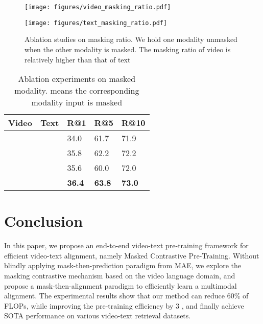 \documentclass[10pt,twocolumn,letterpaper]{article}
\begin{document}
\begin{figure}[htbp]
\centering
\setlength{\abovecaptionskip}{0.cm}
\begin{minipage}[t]{0.48\textwidth}
\centering
\texttt{[image: figures/video\_masking\_ratio.pdf]}
\end{minipage}
\begin{minipage}[t]{0.48\textwidth}
\centering
\texttt{[image: figures/text\_masking\_ratio.pdf]}
 \caption{Ablation studies on masking ratio. We hold one modality unmasked when the other modality is masked. The masking ratio of video is relatively higher than that of text} 
\label{fig:masking ratio}\vspace{-1mm}

\end{minipage}
\end{figure}





\begin{table}[h]
    \centering
    \small
    \begin{tabular}{@{}ll|lll@{}}
    \toprule
    \textbf{Video}  &  \textbf{Text}   &  \textbf{R@1}   & \textbf{R@5}    & \textbf{R@10}     \\ \midrule
                  &                  &  34.0      & 61.7      & 71.9    \\
      &                  & 35.8       & 62.2      & 72.2    \\ 
                  &      & 35.6       & 60.0      & 72.0         \\  
      &      & \textbf{36.4}       &  \textbf{63.8}     & \textbf{73.0}         \\ \bottomrule 
    \end{tabular}
    \caption{Ablation experiments on masked modality.  means the corresponding modality input is masked}
    \label{tab:modality-ablations}\vspace{-1mm}
    \end{table}
    




\vspace{-1mm}\section{Conclusion}\vspace{-1mm}
In this paper, we propose an end-to-end video-text pre-training framework for efficient video-text alignment, namely Masked Contrastive Pre-Training. Without blindly applying mask-then-prediction paradigm from MAE, we explore the masking contrastive mechanism based on the video language domain, and propose a mask-then-alignment paradigm  to efficiently learn a multimodal alignment. The experimental results show that our method can reduce 60\% of FLOPs, while improving the pre-training efficiency by 3 , and finally achieve SOTA performance on various video-text retrieval datasets.

{\small


}
\end{document}
